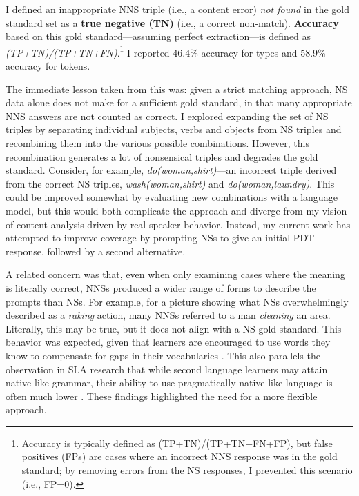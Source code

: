 I defined an inappropriate NNS triple (i.e., a content error)
\textit{not found} in the gold standard set as a \textbf{true negative
  (TN)} (i.e., a correct non-match). \textbf{Accuracy} based on this
gold standard---assuming perfect extraction---is defined as
\textit{(TP+TN)/(TP+TN+FN)}.\footnote{Accuracy is typically defined as (TP+TN)/(TP+TN+FN+FP), but false positives (FPs) are cases where an incorrect NNS response was in the gold standard; by removing errors from the NS responses, I prevented this scenario (i.e., FP=0).} I reported 46.4\% accuracy for types and 58.9\% accuracy for tokens.

The immediate lesson taken from this was: given a strict matching approach, NS data alone does not make for a sufficient gold standard, in that many appropriate NNS answers are not counted as correct. I explored expanding the set of NS triples by separating individual subjects, verbs and objects from NS triples and recombining them into the various possible combinations. However, this recombination generates a lot of nonsensical triples and degrades the gold standard. Consider, for example, \textit{do(woman,shirt)}---an incorrect triple derived from the correct NS triples, \textit{wash(woman,shirt)} and \textit{do(woman,laundry)}. This could be improved somewhat by evaluating new combinations with a language model, but this would both complicate the approach and diverge from my vision of content analysis driven by real speaker behavior. Instead, my current work has attempted to improve coverage by prompting NSs to give an initial PDT response, followed by a second alternative.

A related concern was that, even when only examining cases
where the meaning is literally correct, NNSs produced a wider range of
forms to describe the prompts than NSs. For example, for a picture
showing what NSs overwhelmingly described as a \textit{raking} action,
many NNSs referred to a man \textit{cleaning} an area. Literally,
this may be true, but it does not align with a NS gold standard. 
This behavior was expected, given that learners are encouraged
to use words they know to compensate for gaps in their vocabularies
\citep{AgustinLlach2010}. This also parallels the observation in SLA research that while second language learners may attain native-like grammar, their ability to use
pragmatically native-like language is often much lower
\citep{BardoviDornyei1998}. 
These findings highlighted the need for a more flexible approach.

